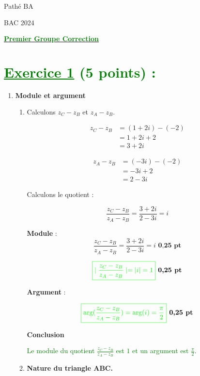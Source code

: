 \documentclass[12pt]{article}
\begin{document}
\begin{minipage}{0.8\textwidth}
	Pathé BA                          
\end{minipage}
\begin{minipage}{0.8\textwidth}
	BAC 2024
\end{minipage}

\begin{center}
\textbf{{\underline{\textcolor{green}{Premier Groupe Correction}}}}
\end{center}
\section*{\textcolor{green}{\underline{Exercice 1} (5 points) :}}
\begin{enumerate}
\item
\textbf{Module et argument}
\begin{enumerate}
\item Calculons \(z_C - z_B\) et \(z_A - z_B\).

\begin{align*}
    z_C - z_B &= (1 + 2i) - (-2) \\
              &= 1 + 2i + 2 \\
              &= 3 + 2i
\end{align*}

\begin{align*}
    z_A - z_B &= (-3i) - (-2) \\
              &= -3i + 2 \\
              &= 2 - 3i
\end{align*}

Calculons le quotient :

\[
\frac{z_C - z_B}{z_A - z_B} = \frac{3 + 2i}{2 - 3i}=i
\]

	\textbf{Module} :
\[
\frac{z_C - z_B}{z_A - z_B} = \frac{3 + 2i}{2 - 3i}=i\textbf{ 0,25 pt}
\]

\[
\textcolor{green}{\boxed{\mid\frac{z_C - z_B}{z_A - z_B}\mid = |i|=1}}\textbf{ 0,25 pt}
\]

	\textbf{Argument} :

\[
\textcolor{green}{\boxed{\arg(\frac{z_C - z_B}{z_A - z_B})=\arg(i) = \frac{\pi}{2}}}\textbf{ 0,25 pt}
\]

\textbf{Conclusion}

\textcolor{green}{Le module du quotient \(\frac{z_C - z_B}{z_A - z_B}\) est \(1\) et un argument est \(\frac{\pi}{2}\)}.
\item \textbf{Nature du triangle ABC.}


\end{enumerate}
\end{enumerate}
\end{document}
